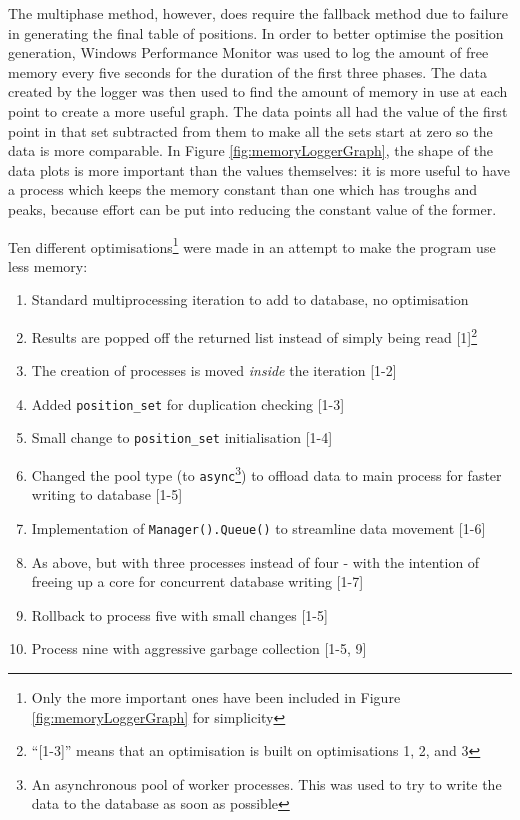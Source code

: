 \documentclass{report}
\newcommand{\tit}[1]{\textit{#1}}
\begin{document}
    The multiphase method, however, does require the fallback method due to failure in generating the final table of positions. In order to better optimise the position generation, Windows Performance Monitor was used to log the amount of free memory every five seconds for the duration of the first three phases. The data created by the logger was then used to find the amount of memory in use at each point to create a more useful graph. The data points all had the value of the first point in that set subtracted from them to make all the sets start at zero so the data is more comparable. In Figure \ref{fig:memoryLoggerGraph}, the shape of the data plots is more important than the values themselves: it is more useful to have a process which keeps the memory constant than one which has troughs and peaks, because effort can be put into reducing the constant value of the former.
    
    Ten different optimisations\footnote{Only the more important ones have been included in Figure \ref{fig:memoryLoggerGraph} for simplicity} were made in an attempt to make the program use less memory:
    
    \begin{enumerate}
    	\item Standard multiprocessing iteration to add to database, no optimisation
    	\item Results are popped off the returned list instead of simply being read [1]\footnote{\enquote{[1-3]} means that an optimisation is built on optimisations 1, 2, and 3}
    	\item The creation of processes is moved \tit{inside} the iteration [1-2]
    	\item Added \lstinline|position_set| for duplication checking [1-3]
    	\item Small change to \lstinline|position_set| initialisation [1-4]
    	\item Changed the pool type (to \lstinline|async|\footnote{An asynchronous pool of worker processes. This was used to try to write the data to the database as soon as possible}) to offload data to main process for faster writing to database [1-5]
    	\item Implementation of \lstinline|Manager().Queue()| to streamline data movement [1-6]
    	\item As above, but with three processes instead of four - with the intention of freeing up a core for concurrent database writing [1-7]
    	\item Rollback to process five with small changes [1-5]
    	\item Process nine with aggressive garbage collection [1-5, 9]
    \end{enumerate}
    
\end{document}
